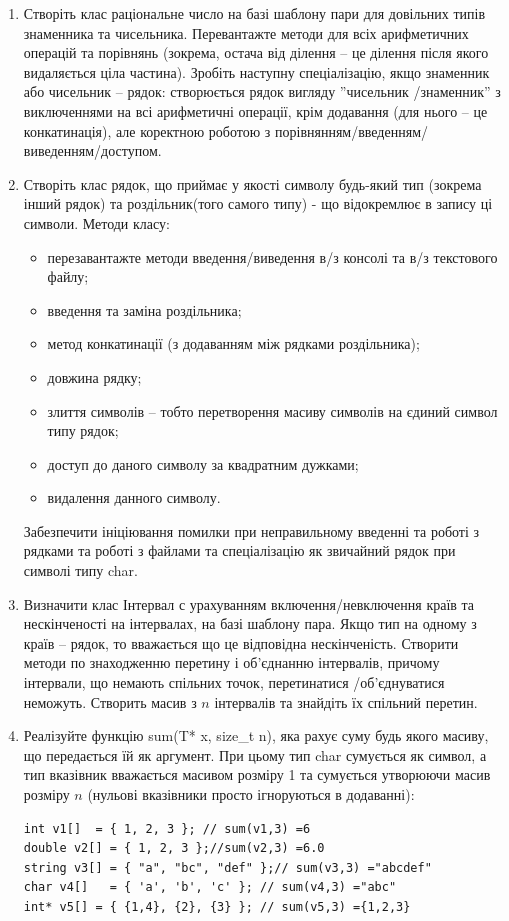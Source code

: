 \documentclass[a5paper,titlepage,openany,twoside,draft]{book_unv}%
\begin{document}
\begin{enumerate}
\item
Створіть клас раціональне число на базі шаблону пари для довільних типів знаменника та чисельника.
Перевантажте методи для всіх арифметичних операцій та порівнянь 
(зокрема, остача від ділення -- це ділення після якого видаляється ціла частина). 
Зробіть наступну спеціалізацію, якщо знаменник або чисельник -- рядок:
створюється рядок вигляду ''{чисельник} /{знаменник}'' з виключеннями на всі арифметичні операції,
крім додавання (для нього -- це конкатинація), але коректною роботою з 
порівнянням/введенням/виведенням/доступом.

\item
Створіть клас рядок, що приймає у якості символу будь-який тип (зокрема інший рядок) 
та роздільник(того самого типу) - що відокремлює в запису ці символи. 
Методи класу:
\begin{itemize}
\item
перезавантажте методи введення/виведення в/з консолі та в/з текстового файлу;
\item
введення та заміна роздільника;
\item
метод конкатинації (з додаванням між рядками роздільника);
\item
довжина рядку;
\item
злиття символів -- тобто перетворення масиву символів на єдиний символ типу рядок;
\item
доступ до даного символу за квадратним дужками;
\item
видалення данного символу.
\end{itemize}
Забезпечити ініціювання помилки при неправильному введенні та роботі з рядками 
та роботі з файлами та спеціалізацію як звичайний рядок при символі типу char.

\item
Визначити клас Інтервал с урахуванням включення/невключення країв та нескінченості на інтервалах,
на базі шаблону пара. Якщо тип на одному з країв -- рядок, то вважається 
що це відповідна нескінченість.  
Створити методи по знаходженню перетину і об'єднанню інтервалів, 
причому інтервали, що немають спільних точок, перетинатися /об'єднуватися неможуть. 
Створить масив з $n$ інтервалів та знайдіть їх спільний перетин.
 
\item
Реалізуйте функцію sum(T* x, size\_t n), яка рахує суму будь якого масиву, що передається їй як аргумент.
При цьому тип char сумується як символ, а тип вказівник вважається масивом розміру 1 та сумується утворюючи 
масив розміру $n$ (нульові вказівники просто ігноруються в додаванні):
\begin{verbatim}
int v1[]  = { 1, 2, 3 }; // sum(v1,3) =6 
double v2[] = { 1, 2, 3 };//sum(v2,3) =6.0 
string v3[] = { "a", "bc", "def" };// sum(v3,3) ="abcdef"
char v4[]   = { 'a', 'b', 'c' }; // sum(v4,3) ="abc"
int* v5[] = { {1,4}, {2}, {3} }; // sum(v5,3) ={1,2,3}
\end{verbatim}


\end{enumerate}
\end{document}
